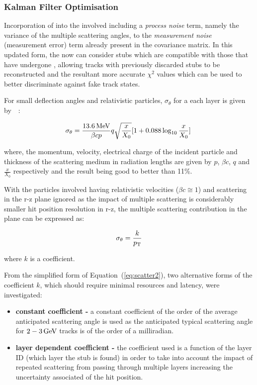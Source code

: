 \subsubsection{Kalman Filter Optimisation}\label{subsubsec:lowPtOptKF}
Incorporation of \MS into the \KF involved including a \emph{process noise} term, namely the variance of the multiple scattering angles, to the \emph{measurement noise} (\ie measurement error) term already present in the \KF covariance matrix.
In this updated form, the \KF now can consider stubs which are compatible with those that have undergone \MS, allowing tracks with previously discarded stubs to be reconstructed and the resultant more accurate $\chi^{2}$ values which can be used to better discriminate against fake track states.

For small deflection angles and relativistic particles, $\sigma_{\theta}$ for a each layer is given by~\cite{Lynch:1990sq}~:

\begin{equation}
\sigma_{\theta} = \frac{13.6\,\text{Me\hspace{-.08em}V}}{\beta c p} q \sqrt{\frac{x}{X_{0}}} [1 + 0.088 \log_{10}{\frac{x}{X_{0}}}]  \;
\label{eq:scatter1}
\end{equation}

where, the momentum, velocity, electrical charge of the incident particle and thickness of the scattering medium in radiation lengths are given by $p$, $\beta c$, $q$ and $\frac{x}{X_{0}}$ respectively and the result being good to better than 11\%.

With the particles involved having relativistic velocities (\ie $\beta c \cong 1$) and scattering in the r-z plane ignored as the impact of multiple scattering is considerably smaller hit position resolution in r-z, the multiple scattering contribution in the \rphi plane can be expressed as:

\begin{equation}
\sigma_{\theta} = \frac{k}{p_{\mathrm{T}}}
\label{eq:scatter2}
\end{equation}

where $k$ is a coefficient.

From the simplified form of Equation~(\ref{eq:scatter2}), two alternative forms of the coefficient $k$, which should require minimal resources and latency, were investigated:

\begin{itemize}
\item \textbf{constant coefficient - } a constant coefficient of the order of the average anticipated scattering angle is used as the anticipated typical scattering angle for $2-3\,\text{Ge\hspace{-.08em}V}$ tracks is of the order of a milliradian.
\item \textbf{layer dependent coefficient -} the coefficient used is a function of the layer ID (\ie which layer the stub is found) in order to take into account the impact of repeated scattering from passing through multiple layers increasing the uncertainty associated of the hit position.
\end{itemize}

